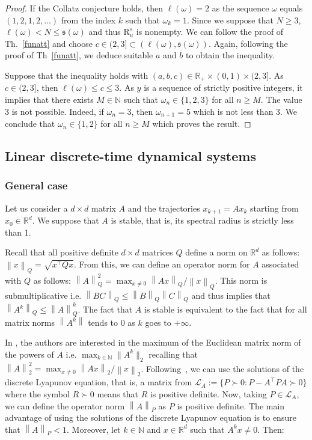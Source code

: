 \documentclass{article}
\def\valu#1{\mathfrak{s}(#1)}
\def\ls#1{\boldsymbol{\ell}(#1)}
\def\norm#1{\left\|#1\right\|}
\def\rr{\mathbb R}
\def\rd{\rr^d}
\def\nn{\mathbb N}
\def\gls#1{{\mathrm R}_{#1}}
\def\gsls#1{\gls{#1}^s}
\def\red#1{#1}
\def\blue#1{#1}
\begin{document}
		\begin{proof}
			If the Collatz conjecture holds, then \blue{$\ls{\blue{\omega}}=2$} as \blue{the sequence $\omega$ equals $(1,2,1,2,\ldots)$ from the index $k$ such that $\omega_k=1$.} Since we suppose that \blue{$N\geq 3$, $\ls{\blue{\omega}}<N\leq \valu{\blue{\omega}}$ and thus } $\gsls{u}$ is nonempty. We can follow the proof of \blue{Th.}~\ref{funatt} and choose $c\in \blue{(2,3]}\subset (\ls{\blue{\omega}},\valu{\blue{\omega}})$. Again, following the proof of Th~\ref{funatt}, we deduce suitable $a$ and $b$ to obtain the inequality.
			
			Suppose that the inequality holds with $(a,b,c)\in \rr_+\times (0,1)\times \blue{(2,3]}$. As $c\in \blue{(2,3]}$, then $\ls{\blue{\omega}}\leq c\leq \blue{3}$. As $y$ is a sequence of strictly positive integers, it implies that there exists $M\in\nn$ such that $\blue{\omega}_n\in\blue{\{1,2,3\}}$ for all $n\geq M$. The value \blue{3 is not possible}. Indeed, if $\blue{\omega}_n=3$, then $\blue{\omega}_{n+1}=5$ which is not less than 3. \blue{We conclude that  $\omega_n\in\{1,2\}$ for all $n\geq M$ which proves the result.} 
		\end{proof}
		
		\subsection{Linear \red{discrete}-time dynamical systems}
		
		\subsubsection{General case}
		Let \red{us} consider a $d\times d$ matrix $A$ and the trajectories $x_{k+1}= A x_k$ starting from $x_0\in\rd$. We suppose that $A$ is stable\red{, that is,} its spectral radius is strictly less than 1.
		
		Recall that all positive definite $d\times d$ matrices $Q$ define a norm on $\rd$ as follows: $\norm{x}_Q=\sqrt{x^\intercal Q x}$. From this, we can define an operator norm for $A$ associated \red{with} $Q$ as follows: $\norm{A}_Q^2=\max_{x\neq 0}  \norm{Ax}_Q/\norm{x}_Q$. This norm is submultiplicative i.e. $\norm{BC}_Q\leq \norm{B}_Q\norm{C}_Q$ and thus implies that $\norm{A^k}_Q\leq \norm{A}_Q^k$. The fact that $A$ is stable is equivalent to \red{the fact} that for all matrix norms $\norm{A^k}$ tends to 0 as $k$ goes to $+\infty$.  
		
		In \cite{ahiyevich2018upper,dowler2013bounding,7984147}, the authors are interested in the maximum of the Euclidean matrix norm of the powers of $A$ i.e. $\max_{k\in\nn}\|A^k\|_2$ recalling that $\norm{A}_2^2=\max_{x\neq 0}\norm{Ax}_2/\norm{x}_2$. Following~\cite{adje13052025}, we can use \red{the} solutions of the discrete Lyapunov equation\red{, that is,} a matrix from $\mathcal{L}_A:=\{P \succ 0 : P-A^\intercal P A\succ 0\}$ where the symbol $R \succ 0$ means that $R$ is positive definite. Now, taking $P\in\mathcal{L}_A$, we can define the operator norm $\norm{A}_P$ as $P$ is positive definite. The main advantage of using \red{the} solutions of the discrete Lyapunov equation is to ensure that $\norm{A}_P<1$. Moreover, let $k\in\nn$ and $x\in\rd$ such that $A^k x\neq 0$. Then:
		
\end{document}
